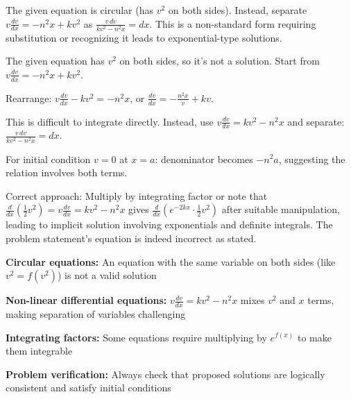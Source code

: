 \begin{hint}
The given equation is circular (has $v^2$ on both sides). Instead, separate $v\frac{dv}{dx} = -n^2x + kv^2$ as $\frac{v\,dv}{kv^2 - n^2x} = dx$. This is a non-standard form requiring substitution or recognizing it leads to exponential-type solutions.
\end{hint}

\begin{solution}
The given equation has $v^2$ on both sides, so it's not a solution. Start from $v\frac{dv}{dx} = -n^2x + kv^2$.

Rearrange: $v\frac{dv}{dx} - kv^2 = -n^2x$, or $\frac{dv}{dx} = -\frac{n^2x}{v} + kv$.

This is difficult to integrate directly. Instead, use $v\frac{dv}{dx} = kv^2 - n^2x$ and separate: $\frac{v\,dv}{kv^2 - n^2x} = dx$.

For initial condition $v = 0$ at $x = a$: denominator becomes $-n^2a$, suggesting the relation involves both terms.

Correct approach: Multiply by integrating factor or note that $\frac{d}{dx}\left(\frac{1}{2}v^2\right) = v\frac{dv}{dx} = kv^2 - n^2x$ gives $\frac{d}{dx}\left(e^{-2kx} \cdot \frac{1}{2}v^2\right)$ after suitable manipulation, leading to implicit solution involving exponentials and definite integrals. The problem statement's equation is indeed incorrect as stated.
\end{solution}

\begin{takeaways}
\item \textbf{Circular equations:} An equation with the same variable on both sides (like $v^2 = f(v^2)$) is not a valid solution
\item \textbf{Non-linear differential equations:} $v\frac{dv}{dx} = kv^2 - n^2x$ mixes $v^2$ and $x$ terms, making separation of variables challenging
\item \textbf{Integrating factors:} Some equations require multiplying by $e^{f(x)}$ to make them integrable
\item \textbf{Problem verification:} Always check that proposed solutions are logically consistent and satisfy initial conditions
\end{takeaways}

